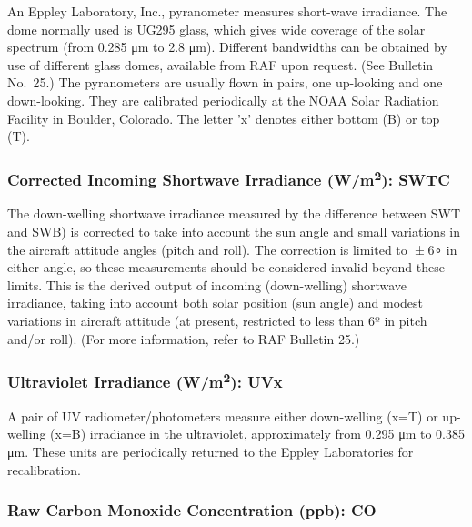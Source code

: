 \documentclass[
  english,
]{book}
\begin{document}
An Eppley Laboratory, Inc., pyranometer measures short-wave irradiance.
The dome normally used is UG295 glass, which gives wide coverage of the
solar spectrum (from 0.285 {μm} to 2.8 {μm}). Different bandwidths can
be obtained by use of different glass domes, available from RAF upon
request. (See Bulletin No.~25.) The pyranometers are usually flown in
pairs, one up-looking and one down-looking. They are calibrated
periodically at the NOAA Solar Radiation Facility in Boulder, Colorado.
The letter 'x' denotes either bottom (B) or top (T).

\hypertarget{swtc}{%
\subsubsection*{\texorpdfstring{Corrected Incoming Shortwave Irradiance
(W/m\textsuperscript{2}):
SWTC}{Corrected Incoming Shortwave Irradiance (W/m2): SWTC}}\label{swtc}}

The down-welling shortwave irradiance measured by the difference between
SWT and SWB) is corrected to take into account the sun angle and small
variations in the aircraft attitude angles (pitch and roll). The
correction is limited to { ± 6∘} in either angle, so these measurements
should be considered invalid beyond these limits. This is the derived
output of incoming (down-welling) shortwave irradiance, taking into
account both solar position (sun angle) and modest variations in
aircraft attitude (at present, restricted to less than 6{º} in pitch
and/or roll). (For more information, refer to RAF Bulletin 25.)

\hypertarget{uvx}{%
\subsubsection*{\texorpdfstring{Ultraviolet Irradiance
(W/m\textsuperscript{2}):
UVx}{Ultraviolet Irradiance (W/m2): UVx}}\label{uvx}}

A pair of UV radiometer/photometers measure either down-welling (x=T) or
up-welling (x=B) irradiance in the ultraviolet, approximately from 0.295
{μm} to 0.385 {μm}. These units are periodically returned to the Eppley
Laboratories for recalibration.

\hypertarget{co}{%
\subsubsection*{Raw Carbon Monoxide Concentration (ppb): CO}\label{co}}
\end{document}

